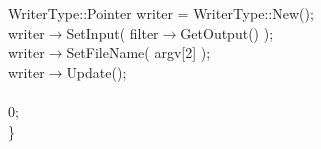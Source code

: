 \begin{flushleft}
\hspace*{2\indentation}WriterType::Pointer writer = WriterType::New();\mbox{}\\
\hspace*{2\indentation}writer$\rightarrow$SetInput( filter$\rightarrow$GetOutput() );\mbox{}\\
\hspace*{2\indentation}writer$\rightarrow$SetFileName( argv[2] );\mbox{}\\
\hspace*{2\indentation}writer$\rightarrow$Update();\mbox{}\\
\mbox{}\\
\hspace*{2\indentation}{\bf return} 0;\mbox{}\\
\}\mbox{}\\
\mbox{}\\
\end{flushleft}
